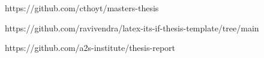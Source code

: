 https://github.com/cthoyt/masters-thesis


https://github.com/ravivendra/latex-its-if-thesis-template/tree/main


https://github.com/a2s-institute/thesis-report
